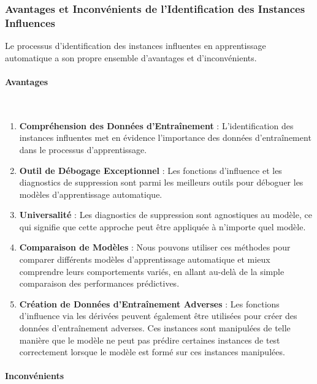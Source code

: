 \subsubsection{Avantages et Inconvénients de l'Identification des Instances Influences}

Le processus d'identification des instances influentes en apprentissage automatique a son propre ensemble d'avantages et d'inconvénients.

\paragraph{Avantages}
\\

\begin{enumerate}
    \item \textbf{Compréhension des Données d'Entraînement} : L'identification des instances influentes met en évidence l'importance des données d'entraînement dans le processus d'apprentissage.
    \item \textbf{Outil de Débogage Exceptionnel} : Les fonctions d'influence et les diagnostics de suppression sont parmi les meilleurs outils pour déboguer les modèles d'apprentissage automatique.
    \item \textbf{Universalité} : Les diagnostics de suppression sont agnostiques au modèle, ce qui signifie que cette approche peut être appliquée à n'importe quel modèle.
    \item \textbf{Comparaison de Modèles} : Nous pouvons utiliser ces méthodes pour comparer différents modèles d'apprentissage automatique et mieux comprendre leurs comportements variés, en allant au-delà de la simple comparaison des performances prédictives.
    \item \textbf{Création de Données d'Entraînement Adverses} : Les fonctions d'influence via les dérivées peuvent également être utilisées pour créer des données d'entraînement adverses. Ces instances sont manipulées de telle manière que le modèle ne peut pas prédire certaines instances de test correctement lorsque le modèle est formé sur ces instances manipulées.
\end{enumerate}

\paragraph{Inconvénients}
\\

